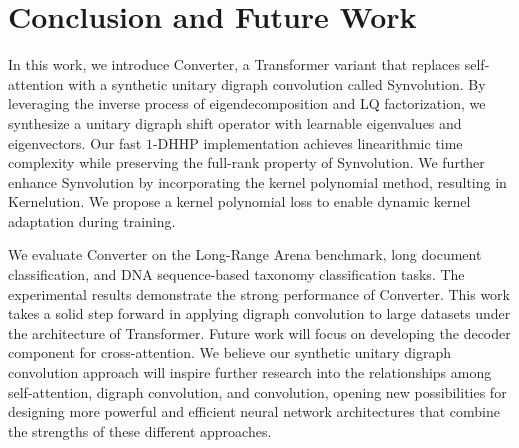 \section{Conclusion and Future Work}
In this work, we introduce Converter, a Transformer variant that replaces self-attention with a synthetic unitary digraph convolution called Synvolution. By leveraging the inverse process of eigendecomposition and LQ factorization, we synthesize a unitary digraph shift operator with learnable eigenvalues and eigenvectors. Our fast $1$-DHHP implementation achieves linearithmic time complexity while preserving the full-rank property of Synvolution. We further enhance Synvolution by incorporating the kernel polynomial method, resulting in Kernelution. We propose a kernel polynomial loss to enable dynamic kernel adaptation during training.

We evaluate Converter on the Long-Range Arena benchmark, long document classification, and DNA sequence-based taxonomy classification tasks. The experimental results demonstrate the strong performance of Converter. This work takes a solid step forward in applying digraph convolution to large datasets under the architecture of Transformer. Future work will focus on developing the decoder component for cross-attention. We believe our synthetic unitary digraph convolution approach will inspire further research into the relationships among self-attention, digraph convolution, and convolution, opening new possibilities for designing more powerful and efficient neural network architectures that combine the strengths of these different approaches.
